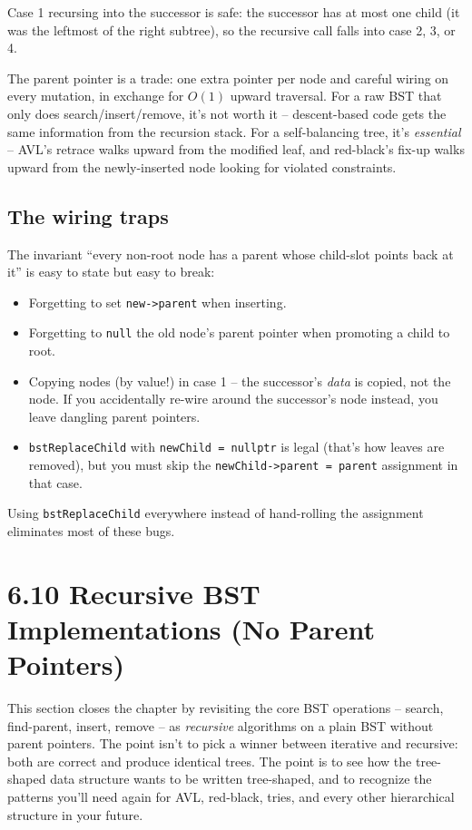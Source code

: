 \documentclass[11pt]{article}
\begin{document}
Case 1 recursing into the successor is safe: the successor has at most one child (it was the leftmost of the right subtree), so the recursive call falls into case 2, 3, or 4.

\begin{ideabox}
The parent pointer is a trade: one extra pointer per node and careful wiring on every mutation, in exchange for $O(1)$ upward traversal. For a raw BST that only does search/insert/remove, it's not worth it -- descent-based code gets the same information from the recursion stack. For a self-balancing tree, it's \emph{essential} -- AVL's retrace walks upward from the modified leaf, and red-black's fix-up walks upward from the newly-inserted node looking for violated constraints.
\end{ideabox}

\subsection*{The wiring traps}

\begin{warnbox}
The invariant ``every non-root node has a parent whose child-slot points back at it'' is easy to state but easy to break:
\begin{itemize}[leftmargin=*]
    \item Forgetting to set \texttt{new->parent} when inserting.
    \item Forgetting to \texttt{null} the old node's parent pointer when promoting a child to root.
    \item Copying nodes (by value!) in case 1 -- the successor's \emph{data} is copied, not the node. If you accidentally re-wire around the successor's node instead, you leave dangling parent pointers.
    \item \texttt{bstReplaceChild} with \texttt{newChild = nullptr} is legal (that's how leaves are removed), but you must skip the \texttt{newChild->parent = parent} assignment in that case.
\end{itemize}
Using \texttt{bstReplaceChild} everywhere instead of hand-rolling the assignment eliminates most of these bugs.
\end{warnbox}

\section{6.10 Recursive BST Implementations (No Parent Pointers)}

This section closes the chapter by revisiting the core BST operations -- search, find-parent, insert, remove -- as \emph{recursive} algorithms on a plain BST without parent pointers. The point isn't to pick a winner between iterative and recursive: both are correct and produce identical trees. The point is to see how the tree-shaped data structure wants to be written tree-shaped, and to recognize the patterns you'll need again for AVL, red-black, tries, and every other hierarchical structure in your future.
\end{document}
